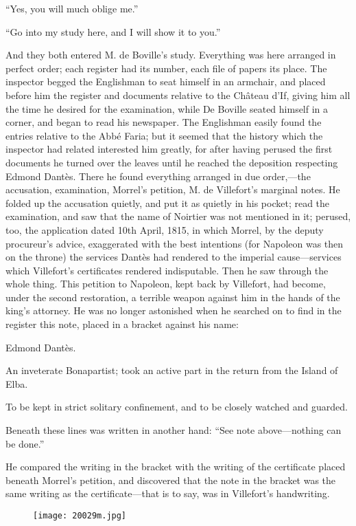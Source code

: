 “Yes, you will much oblige me.”

“Go into my study here, and I will show it to you.”

And they both entered M. de Boville’s study. Everything was here
arranged in perfect order; each register had its number, each file of
papers its place. The inspector begged the Englishman to seat himself
in an armchair, and placed before him the register and documents
relative to the Château d’If, giving him all the time he desired for
the examination, while De Boville seated himself in a corner, and began
to read his newspaper. The Englishman easily found the entries relative
to the Abbé Faria; but it seemed that the history which the inspector
had related interested him greatly, for after having perused the first
documents he turned over the leaves until he reached the deposition
respecting Edmond Dantès. There he found everything arranged in due
order,—the accusation, examination, Morrel’s petition, M. de
Villefort’s marginal notes. He folded up the accusation quietly, and
put it as quietly in his pocket; read the examination, and saw that the
name of Noirtier was not mentioned in it; perused, too, the application
dated 10th April, 1815, in which Morrel, by the deputy procureur’s
advice, exaggerated with the best intentions (for Napoleon was then on
the throne) the services Dantès had rendered to the imperial
cause—services which Villefort’s certificates rendered indisputable.
Then he saw through the whole thing. This petition to Napoleon, kept
back by Villefort, had become, under the second restoration, a terrible
weapon against him in the hands of the king’s attorney. He was no
longer astonished when he searched on to find in the register this
note, placed in a bracket against his name:

Edmond Dantès.

An inveterate Bonapartist; took an active part in the return from the
Island of Elba.

To be kept in strict solitary confinement, and to be closely watched
and guarded.

Beneath these lines was written in another hand: “See note
above—nothing can be done.”

He compared the writing in the bracket with the writing of the
certificate placed beneath Morrel’s petition, and discovered that the
note in the bracket was the same writing as the certificate—that is to
say, was in Villefort’s handwriting.

\begin{figure}[h]
\texttt{[image: 20029m.jpg]}
\end{figure}

